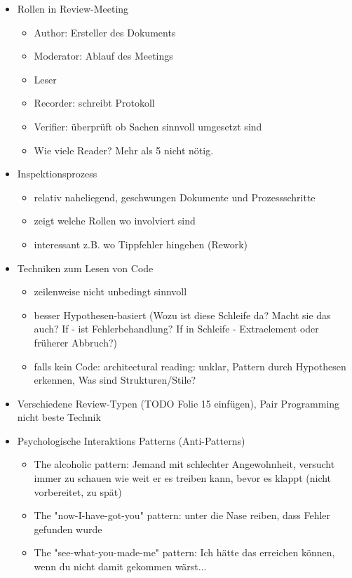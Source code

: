 \documentclass[paper=a4, fontsize=11pt]{scrartcl} %
\numberwithin{equation}{section} %
\numberwithin{figure}{section} %
\numberwithin{table}{section} %
\begin{document}
\begin{itemize}
  \item Rollen in Review-Meeting
  \begin{itemize}
    \item Author: Ersteller des Dokuments
    \item Moderator: Ablauf des Meetings
    \item Leser
    \item Recorder: schreibt Protokoll
    \item Verifier: überprüft ob Sachen sinnvoll umgesetzt sind
    \item Wie viele Reader? Mehr als 5 nicht nötig.
  \end{itemize}
  \item Inspektionsprozess
  \begin{itemize}
    \item relativ naheliegend, geschwungen Dokumente und Prozessschritte
    \item zeigt welche Rollen wo involviert sind
    \item interessant z.B. wo Tippfehler hingehen (Rework)
  \end{itemize}
  \item Techniken zum Lesen von Code
  \begin{itemize}
    \item zeilenweise nicht unbedingt sinnvoll
    \item besser Hypothesen-basiert (Wozu ist diese Schleife da? Macht sie das auch? If - ist Fehlerbehandlung? If in Schleife - Extraelement oder früherer Abbruch?)
    \item falls kein Code: architectural reading: unklar, Pattern durch Hypothesen erkennen, Was sind Strukturen/Stile?
  \end{itemize}
  \item Verschiedene Review-Typen (TODO Folie 15 einfügen), Pair Programming nicht beste Technik
  \item Psychologische Interaktions Patterns (Anti-Patterns)
  \begin{itemize}
    \item The alcoholic pattern: Jemand mit schlechter Angewohnheit, versucht immer zu schauen wie weit er es treiben kann, bevor es klappt (nicht vorbereitet, zu spät)
    \item The "now-I-have-got-you" pattern: unter die Nase reiben, dass Fehler gefunden wurde
    \item The "see-what-you-made-me" pattern: Ich hätte das erreichen können, wenn du nicht damit gekommen wärst...

\end{itemize}
\end{itemize}
\end{document}
